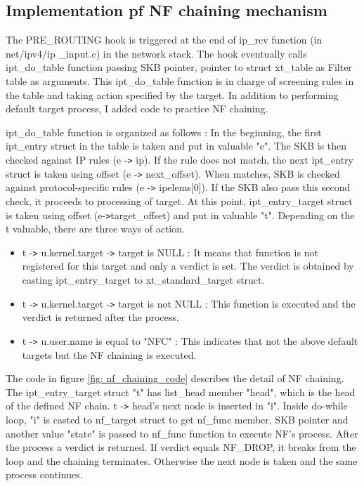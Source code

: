 \subsection{Implementation pf NF chaining mechanism}
The PRE\_ROUTING hook is triggered at the end of ip\_rcv function (in net/ipv4/ip
\_input.c) in the network stack. The hook eventually calls ipt\_do\_table function passing SKB pointer, pointer to struct xt\_table as Filter table as arguments. This ipt\_do\_table function is in charge of screening rules in the table and taking action specified by the  target. In addition to performing default target process, I added code to practice NF chaining. 

ipt\_do\_table function is organized as follows : In the beginning, the first ipt\_entry struct  in the table is taken and put in valuable "e". The SKB is then checked against IP rules (e -\verb#># ip). If the rule does not match, the next ipt\_entry struct is taken using offset (e -\verb#># next\_offset). When matches, SKB is checked against protocol-specific rules (e -\verb#># ipelems[0]). If the SKB also pass this second check, it proceeds to processing of target. At this point, ipt\_entry\_target struct is taken using offset (e-\verb#>#target\_offset) and put in valuable "t". Depending on the t valuable, there are three ways of action. 
\begin{itemize}
	\item t -\verb#># u.kernel.target -\verb#># target is NULL : It means that function is not registered for this target and only a verdict is set. The verdict is obtained by casting ipt\_entry\_target to xt\_standard\_target struct. 
	\item t -\verb#># u.kernel.target -\verb#># target is not NULL : This function is executed and the verdict is returned after the process.   
	\item t -\verb#># u.user.name is equal to "NFC" : This indicates that not the above default targets but the NF chaining is executed. 
\end{itemize}

The code in figure \ref{fig: nf_chaining_code} describes the detail of NF chaining. The ipt\_entry\_target struct "t" has list\_head member "head", which is the head of the defined NF chain. t -\verb#># head's next node is inserted in "i". Inside do-while loop, "i" is casted to nf\_target struct to get nf\_func member. SKB pointer and another value "state" is passed to nf\_func function to execute NF's process. After the process a verdict is returned. If verdict equals NF\_DROP, it breaks from the loop and the chaining terminates. Otherwise the next node is taken and the same process continues. 

